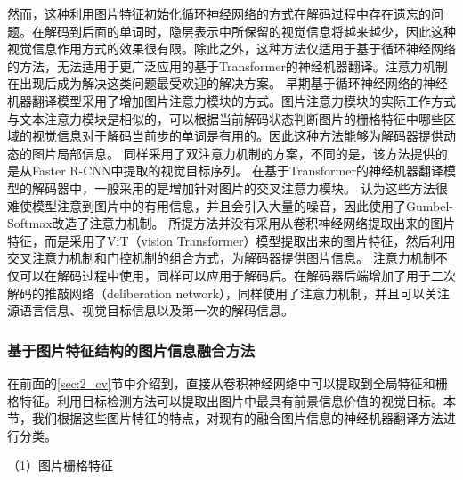 然而，这种利用图片特征初始化循环神经网络的方式在解码过程中存在遗忘的问题。在解码到后面的单词时，隐层表示中所保留的视觉信息将越来越少，因此这种视觉信息作用方式的效果很有限。除此之外，这种方法仅适用于基于循环神经网络的方法，无法适用于更广泛应用的基于Transformer的神经机器翻译。注意力机制在出现后成为解决这类问题最受欢迎的解决方案。
早期基于循环神经网络的神经机器翻译模型采用了增加图片注意力模块的方式。图片注意力模块的实际工作方式与文本注意力模块是相似的，可以根据当前解码状态判断图片的栅格特征中哪些区域的视觉信息对于解码当前步的单词是有用的。因此这种方法能够为解码器提供动态的图片局部信息。
同样采用了双注意力机制的方案，不同的是，该方法提供的是从Faster R-CNN中提取的视觉目标序列。
在基于Transformer的神经机器翻译模型的解码器中，一般采用的是增加针对图片的交叉注意力模块。
认为这些方法很难使模型注意到图片中的有用信息，并且会引入大量的噪音，因此使用了Gumbel-Softmax改造了注意力机制。
所提方法并没有采用从卷积神经网络提取出来的图片特征，而是采用了ViT（vision Transformer）模型提取出来的图片特征，然后利用交叉注意力机制和门控机制的组合方式，为解码器提供图片信息。
注意力机制不仅可以在解码过程中使用，同样可以应用于解码后。在解码器后端增加了用于二次解码的推敲网络（deliberation network），同样使用了注意力机制，并且可以关注源语言信息、视觉目标信息以及第一次的解码信息。

\subsubsection{基于图片特征结构的图片信息融合方法}
在前面的\ref{sec:2_cv}节中介绍到，直接从卷积神经网络中可以提取到全局特征和栅格特征。利用目标检测方法可以提取出图片中最具有前景信息价值的视觉目标。本节，我们根据这些图片特征的特点，对现有的融合图片信息的神经机器翻译方法进行分类。

{\sffamily （1）图片栅格特征}

